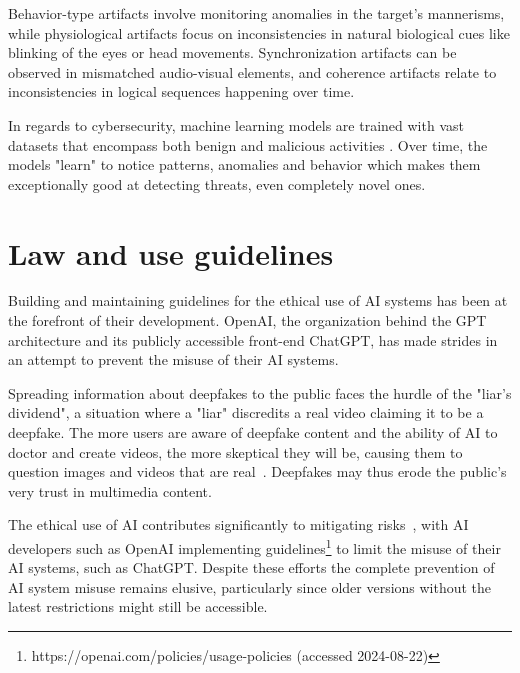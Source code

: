 Behavior-type artifacts involve monitoring anomalies in the target's mannerisms, while physiological artifacts focus on inconsistencies in natural biological cues like blinking of the eyes or head movements. Synchronization artifacts can be observed in mismatched audio-visual elements, and coherence artifacts relate to inconsistencies in logical sequences happening over time.

In regards to cybersecurity, machine learning models are trained with vast datasets that encompass both benign and malicious activities \citep{fakhouri_AI_Driven_Solutions_SE_Attacks_2024}. Over time, the models "learn" to notice patterns, anomalies and behavior which makes them exceptionally good at detecting threats, even completely novel ones.




\section{Law and use guidelines}
\begin{comment}
    


\end{comment}

Building and maintaining guidelines for the ethical use of AI systems has been at the forefront of their development. OpenAI, the organization behind the GPT architecture and its publicly accessible front-end ChatGPT, has made strides in an attempt to prevent the misuse of their AI systems.

Spreading information about deepfakes to the public faces the hurdle of the "liar's dividend", a situation where a "liar" discredits a real video claiming it to be a deepfake. The more users are aware of deepfake content and the ability of AI to doctor and create videos, the more skeptical they will be, causing them to question images and videos that are real~\citep{blauth_AI_Crime_Overview_Malicious_Use_Abuse_2022}. Deepfakes may thus erode the public's very trust in multimedia content.

The ethical use of AI contributes significantly to mitigating risks~\citep{guptaFromChatGPTtoThreatGPT2023}, with AI developers such as OpenAI implementing guidelines\footnote{https://openai.com/policies/usage-policies (accessed 2024-08-22)} to limit the misuse of their AI systems, such as ChatGPT. Despite these efforts the complete prevention of AI system misuse remains elusive, particularly since older versions without the latest restrictions might still be accessible.

